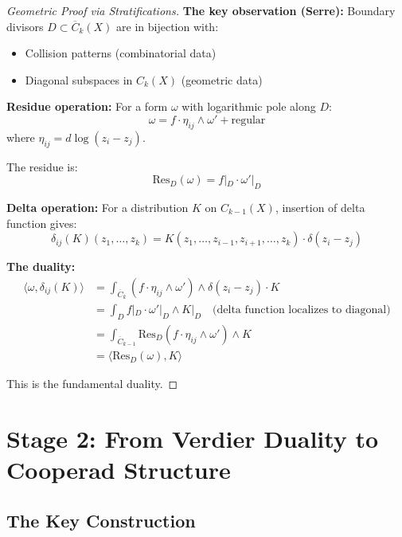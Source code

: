 \begin{proof}[Geometric Proof via Stratifications]
\textbf{The key observation (Serre):} Boundary divisors $D \subset \overline{C}_k(X)$ are in bijection with:
\begin{itemize}
\item Collision patterns (combinatorial data)
\item Diagonal subspaces in $C_k(X)$ (geometric data)
\end{itemize}

\textbf{Residue operation:}
For a form $\omega$ with logarithmic pole along $D$:
$$\omega = f \cdot \eta_{ij} \wedge \omega' + \text{regular}$$
where $\eta_{ij} = d\log(z_i - z_j)$.

The residue is:
$$\text{Res}_D(\omega) = f|_D \cdot \omega'|_D$$

\textbf{Delta operation:}
For a distribution $K$ on $C_{k-1}(X)$, insertion of delta function gives:
$$\delta_{ij}(K)(z_1, \ldots, z_k) = K(z_1, \ldots, z_{i-1}, z_{i+1}, \ldots, z_k) \cdot \delta(z_i - z_j)$$

\textbf{The duality:}
\begin{align*}
\langle \omega, \delta_{ij}(K) \rangle &= \int_{\overline{C}_k} (f \cdot \eta_{ij} \wedge \omega') \wedge \delta(z_i - z_j) \cdot K\\
&= \int_{D} f|_D \cdot \omega'|_D \wedge K|_D \quad \text{(delta function localizes to diagonal)}\\
&= \int_{\overline{C}_{k-1}} \text{Res}_D(f \cdot \eta_{ij} \wedge \omega') \wedge K\\
&= \langle \text{Res}_D(\omega), K \rangle
\end{align*}

This is the fundamental duality.
\end{proof}

\section{Stage 2: From Verdier Duality to Cooperad Structure}

\subsection{The Key Construction}

